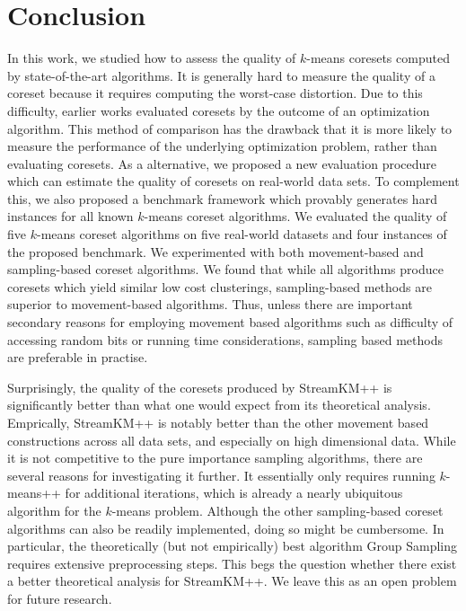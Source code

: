 \section{Conclusion} \label{sec:conclusion}
In this work, we studied how to assess the quality of $k$-means coresets computed by state-of-the-art algorithms. It is generally hard to measure the quality of a coreset because it requires computing the worst-case distortion. Due to this difficulty, earlier works evaluated coresets by the outcome of an optimization algorithm. This method of comparison has the drawback that it is more likely to measure the performance of the underlying optimization problem, rather than evaluating coresets. As a alternative, we proposed a new evaluation procedure which can estimate the quality of coresets on real-world data sets. To complement this, we also proposed a benchmark framework which provably generates hard instances for all known $k$-means coreset algorithms. We evaluated the quality of five $k$-means coreset algorithms on five real-world datasets and four instances of the proposed benchmark. We experimented with both movement-based and sampling-based coreset algorithms. We found that while all algorithms produce coresets which yield similar low cost clusterings, sampling-based methods are superior to movement-based algorithms. Thus, unless there are important secondary reasons for employing movement based algorithms such as difficulty of accessing random bits or running time considerations, sampling based methods are preferable in practise.


Surprisingly, the quality of the coresets produced by StreamKM++ is significantly better than what one would expect from its theoretical analysis.
Emprically, StreamKM++ is notably better than the other movement based constructions across all data sets, and especially on high dimensional data.
While it is not competitive to the pure importance sampling algorithms, there are several reasons for investigating it further. It essentially only requires running $k$-means++ for additional iterations, which is already a nearly ubiquitous algorithm for the $k$-means problem. Although the other sampling-based coreset algorithms can also be readily implemented, doing so might be cumbersome. In particular, the theoretically (but not empirically) best algorithm Group Sampling requires extensive preprocessing steps.
This begs the question whether there exist a better theoretical analysis for StreamKM++. We leave this as an open problem for future research.
